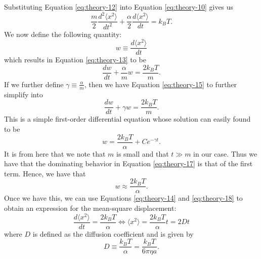 \documentclass[twocolumn,amsmath,amssymb,pra, floatfix]{revtex4-2}
\begin{document}
Substituting Equation \ref{eq:theory-12} into Equation \ref{eq:theory-10} gives us 
\begin{equation}
    \frac{m}{2} \frac{ d^{2} \langle x^{2} \rangle }{ d t^{2} } 
    +
    \frac{\alpha}{2} \frac{ d \langle x^{2} \rangle }{ d t }
    =
    k_{B} T.
    \label{eq:theory-13}
\end{equation}
We now define the following quantity:
\begin{equation}
    w
    \equiv
    \frac{ d \langle x^{2} \rangle }{ d t }
    \label{eq:theory-14}
\end{equation}
which results in Equation \ref{eq:theory-13} to be 
\begin{equation}
    \frac{ d w }{ d t }
    +
    \frac{\alpha}{m} w 
    =
    \frac{2 k_{B} T}{m}.
    \label{eq:theory-15}
\end{equation}
If we further define $\gamma \equiv \frac{\alpha}{m}$, then we have Equation \ref{eq:theory-15} to further simplify into 
\begin{equation}
    \frac{ d w }{ d t }
    +
    \gamma w 
    =
    \frac{2 k_{B} T}{m}.
    \label{eq:theory-16}
\end{equation}
This is a simple first-order differential equation whose solution can easily found to be 
\begin{equation}
    w
    =
    \frac{2 k_{B} T}{\alpha} + C e^{- \gamma t}.
    \label{eq:theory-17}
\end{equation}
It is from here that we note that $m$ is small and that $t \gg m$ in our case. Thus we have that the dominating behavior in Equation \ref{eq:theory-17} is that of the first term. Hence, we have that 
\begin{equation}
    w \approx \frac{2 k_{B} T}{\alpha}.
    \label{eq:theory-18}
\end{equation}
Once we have this, we can use Equations \ref{eq:theory-14} and \ref{eq:theory-18} to obtain an expression for the mean-square displacement:
\begin{equation}
    \frac{ d \langle x^{2} \rangle }{ d t }
    =
    \frac{2 k_{B} T}{\alpha}
    \iff 
    \langle x^{2} \rangle
    =
    \frac{2 k_{B} T}{\alpha} t
    =
    2 D t
    \label{eq:theory-19}
\end{equation}
where $D$ is defined as the diffusion coefficient and is given by 
\begin{equation}
    D
    \equiv 
    \frac{k_{B} T}{\alpha}
    =
    \frac{k_{B} T}{6 \pi \eta a}.
    \label{eq:theory-20}
\end{equation}
\end{document}
